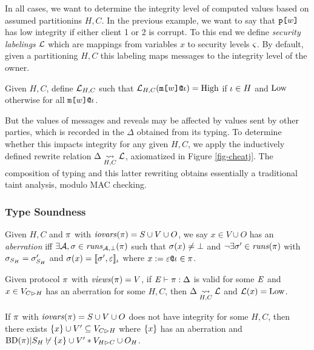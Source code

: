 In all cases, we want to determine the integrity level of computed
values based on assumed partitionins $H,C$. In the previous example,
we want to say that $\texttt{p[}w\texttt{]}$ has low integrity if either client 1 or
2 is corrupt.  To this end we define \emph{security labelings}
$\mathcal{L}$ which are mappings from variables $x$ to security levels
$\varsigma$. By default, given a partitioning $H,C$ this labeling maps
messages to the integrity level of the owner.
\begin{definition}  
  Given $H,C$,
  define $\mathcal{L}_{H,C}$ such that $\mathcal{L}_{H,C}(\texttt{m[}w\texttt{]}\texttt{@}\iota ) = \mathrm{High}$
  if $\iota \in H$  and $\mathrm{Low}$
  otherwise for all $\texttt{m[}w\texttt{]}\texttt{@}\iota$.
\end{definition}
But the values of messages and reveals may be
affected by values sent by other parties, which is
recorded in the $\Delta$ obtained from its typing. To determine
whether this impacts integrity for any given $H,C$, we apply
the inductively defined rewrite relation $\Delta \underset{H,C}{\leadsto} \mathcal{L}$,
axiomatized in Figure \ref{fig-cheatj}. The composition
of typing and this latter rewriting obtains essentially
a traditional taint analysis, modulo MAC checking. 

\subsubsection{Type Soundness}

\begin{definition}
  Given $H,C$ and $\pi$ with $\mathit{iovars}(\pi) = S \cup V \cup O$,
  we say $x \in V \cup O$ has an \emph{aberration} iff
  $\exists \mathcal{A}, \sigma \in \mathit{runs}_{\mathcal{A},\bot}(\pi)$ such that
  $\sigma(x) \ne \bot$ and $\neg\exists \sigma' \in \mathit{runs}(\pi)$
  with  $\sigma_{S_H} = \sigma'_{S_H}$ and
  $\sigma(x) = \llbracket \sigma',\varepsilon \rrbracket_{\iota}$ where
  $x := \varepsilon\texttt{@}\iota \in \pi$.
\end{definition}

\begin{lemma}
  Given protocol $\pi$ with
  $\mathit{views}(\pi) = V$, if 
  $\mathit{E} \vdash \pi : \Delta$ is valid
  for some $\mathit{E}$ and $x \in V_{C \rhd H}$ has an
  aberration for some $H,C$, then $\Delta \underset{H,C}{\leadsto} \mathcal{L}$
  and $\mathcal{L}(x) = \mathrm{Low}$.
\end{lemma}

\begin{lemma}
  If $\pi$ with $\mathit{iovars}(\pi) = S \cup V \cup O$ does not have
  integrity for some $H,C$, then there exists $\{ x \} \cup V'
  \subseteq V_{C \rhd H}$ where $\{ x \}$ has an aberration and
  $\mathrm{BD}(\pi)|S_H \not\vdash \{ x \} \cup V' * V_{H \rhd C} \cup O_H$.
\end{lemma}

